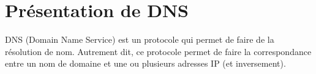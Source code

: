 \chapter{Présentation de DNS}

DNS (Domain Name Service) est un protocole qui permet de faire de la résolution de nom. Autrement dit, ce protocole permet de faire la correspondance entre un nom de domaine et une ou plusieurs adresses IP (et inversement). 
